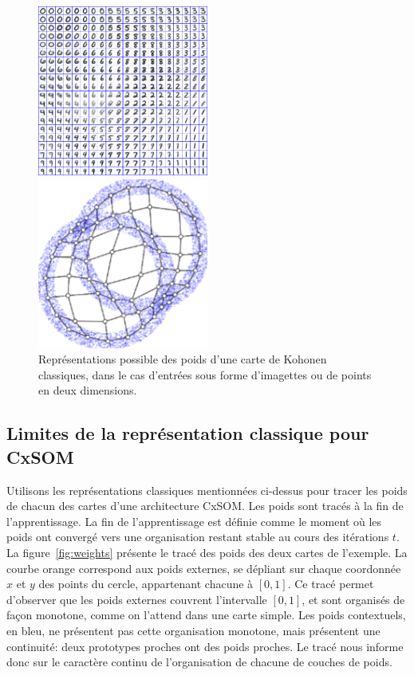 \begin{figure}
\begin{minipage}{0.5\textwidth}
\centering
\includegraphics[width=0.5\textwidth]{digits.jpg}
\end{minipage}
\begin{minipage}{0.5\textwidth}
\centering
\includegraphics[width=0.5\textwidth]{points.png}
\end{minipage}
\caption{Représentations possible des poids d'une carte de Kohonen classiques, dans le cas d'entrées sous forme d'imagettes ou de points en deux dimensions.\label{fig:representation}}
\end{figure}

\subsection{Limites de la représentation classique pour CxSOM}

Utilisons les représentations classiques mentionnées ci-dessus pour tracer les poids de chacun des cartes d'une architecture CxSOM. Les poids sont tracés à la fin de l'apprentissage. La fin de l'apprentissage est définie comme le moment où les poids ont convergé vers une organisation restant stable au cours des itérations $t$.
La figure~\ref{fig:weights} présente le tracé des poids des deux cartes de l'exemple.
La courbe orange correspond aux poids externes, se dépliant sur chaque coordonnée $x$ et $y$ des points du cercle, appartenant chacune à $[0,1]$. Ce tracé permet d'observer que les poids externes couvrent l'intervalle $[0,1]$, et sont organisés de façon monotone, comme on l'attend dans une carte simple. Les poids contextuels, en bleu, ne présentent pas cette organisation monotone, mais présentent une continuité: deux prototypes proches ont des poids proches. Le tracé nous informe donc sur le caractère continu de l'organisation de chacune de couches de poids. 

